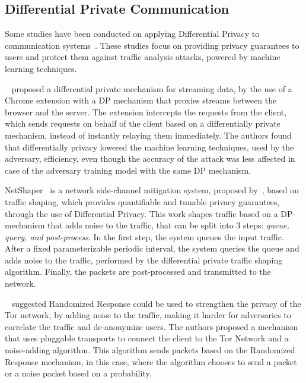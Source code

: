 \subsection{Differential Private Communication}\label{subsec:diff_priv_comm}

Some studies have been conducted on applying Differential Privacy to communication systems~\cite{VilalongaINForum, StatPrivStreaming, NetShaper}. These studies focus on providing privacy guarantees to users and protect them against traffic analysis attacks, powered by machine learning techniques.

\citeauthor{StatPrivStreaming}~\cite{StatPrivStreaming} proposed a differential private mechanism for streaming data, by the use of a Chrome extension with a DP mechanism that proxies streams between the browser and the server. The extension intercepts the requests from the client, which sends requests on behalf of the client based on a differentially private mechanism, instead of instantly relaying them immediately. The authors found that differentially privacy lowered the machine learning techniques, used by the adversary, efficiency, even though the accuracy of the attack was less affected in case of the adversary training model with the same DP mechanism.

NetShaper~\cite{NetShaper} is a network side-channel mitigation system, proposed by~\citeauthor{NetShaper}, based on traffic shaping, which provides quantifiable and tunable privacy guarantees, through the use of Differential Privacy. This work shapes traffic based on a DP-mechanism that adds noise to the traffic, that can be split into 3 steps: \textit{queue, query, and post-process}. In the first step, the system queues the input traffic. After a fixed parameterizable periodic interval, the system queries the queue and adds noise to the traffic, performed by the differential private traffic shaping algorithm. Finally, the packets are post-processed and transmitted to the network. 

\citeauthor{VilalongaINForum}~\cite{VilalongaINForum} suggested Randomized Response could be used to strengthen the privacy of the Tor network, by adding noise to the traffic, making it harder for adversaries to correlate the traffic and de-anonymize users. The authors proposed a mechanism that uses pluggable transports to connect the client to the Tor Network and a noise-adding algorithm. This algorithm sends packets based on the Randomized Response mechanism, in this case, where the algorithm chooses to send a packet or a noise packet based on a probability.

